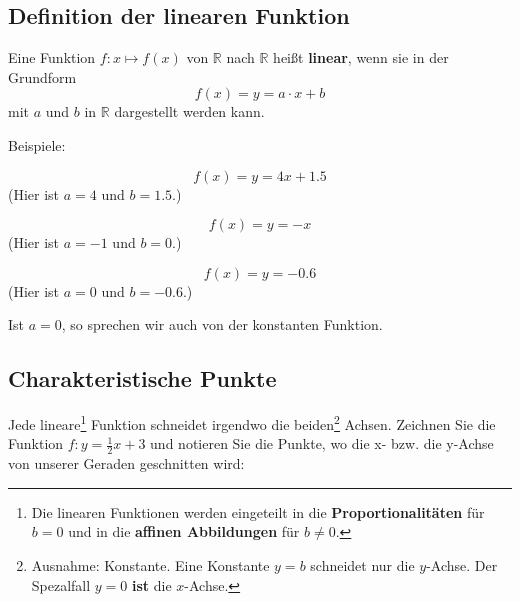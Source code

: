 


\subsection{Definition der linearen Funktion}
Eine Funktion $f: x\mapsto f(x)$ von $\mathbb{R}$ nach $\mathbb{R}$ heißt
\textbf{linear}, wenn sie in der Grundform
$$f(x) = y=a\cdot{}x + b$$
mit $a$ und $b$ in $\mathbb{R}$ dargestellt werden kann.

Beispiele:


$$f(x) = y = 4x + 1.5$$
(Hier ist $a=4$ und $b=1.5$.)

$$f(x) = y = -x$$
(Hier ist $a=-1$ und $b=0$.)

$$f(x) = y = -0.6$$
(Hier ist $a=0$ und $b=-0.6$.)

Ist $a=0$, so sprechen wir auch von der konstanten Funktion.
\newpage



\subsection{Charakteristische Punkte}
Jede lineare\footnote{
  Die linearen Funktionen werden eingeteilt in die \textbf{Proportionalitäten} für $b=0$ und in die \textbf{affinen Abbildungen} für $b\ne{}0$.} Funktion schneidet irgendwo die beiden\footnote{Ausnahme: Konstante. Eine Konstante $y=b$ schneidet nur die $y$-Achse. Der Spezalfall $y=0$ \textbf{ist} die $x$-Achse.} Achsen. Zeichnen Sie die Funktion $f: y=\frac{1}{2}x  +3$ und notieren Sie die Punkte, wo die x- bzw. die y-Achse von unserer Geraden geschnitten wird:

